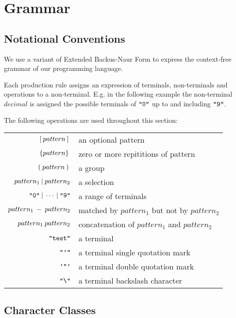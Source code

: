 \section{Grammar}
\label{sec:grammar}

\subsection{Notational Conventions}
We use a variant of Extended Backus-Naur Form to express the context-free grammar of
our programming language.

Each production rule assigns an expression of terminals, non-terminals and operations
to a non-terminal. E.g. in the following example the non-terminal $decimal$ is assigned
the possible terminals of $\texttt{"0"}$ up to and including $\texttt{"9"}$.

\begin{ebnf}
\end{ebnf}

The following operations are used throughout this section:
\begin{center}
\begin{tabular}{r l}
  $[\: pattern \:] \:$ & an optional pattern \\
  $\{pattern\} \:$ & zero or more repititions of pattern \\
  $(\: pattern \:) \:$ & a group \\
  $pattern_1 \: | \: pattern_2$ & a selection \\
  $\texttt{"0"} \: | \: \cdots \: | \: \texttt{"9"}$ & a range of terminals \\
  $pattern_1 \: - \: pattern_2$ & matched by $pattern_1$ but not by $pattern_2$\\
  $pattern_1 \: pattern_2$ & concatenation of $pattern_1$ and $pattern_2$ \\
  $\texttt{"test"}$ & a terminal \\
  $\texttt{"'"}$ & a terminal single quotation mark \\
  $\texttt{'"'}$ & a terminal double quotation mark \\
  $\texttt{"\textbackslash"}$ & a terminal backslash character \\
\end{tabular}
\end{center}


\subsection{Character Classes}
\begin{ebnf}
\end{ebnf}
